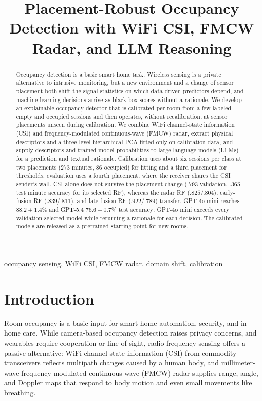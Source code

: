 \documentclass[conference,10pt,letterpaper]{IEEEtran}
\title{Placement-Robust Occupancy Detection with WiFi CSI, FMCW Radar, and LLM Reasoning}
\author{\IEEEauthorblockN{Gad Gad\IEEEauthorrefmark{1}, Mostafa Fouda\IEEEauthorrefmark{2}, Zubair Md Fadlullah\IEEEauthorrefmark{1}}
\IEEEauthorblockA{\IEEEauthorrefmark{1}Department of Computer Science, Western University, London, ON, Canada\\
\IEEEauthorrefmark{2}Department of Electrical and Computer Engineering, Idaho State University, Pocatello, ID, USA}}
\begin{document}
\maketitle
\begin{abstract}

Occupancy detection is a basic smart home task. Wireless sensing is a private alternative to intrusive monitoring, but a new environment and a change of sensor placement both shift the signal statistics on which data-driven predictors depend, and machine-learning decisions arrive as black-box scores without a rationale. We develop an explainable occupancy detector that is calibrated per room from a few labeled empty and occupied sessions and then operates, without recalibration, at sensor placements unseen during calibration.
We combine WiFi channel-state information (CSI) and frequency-modulated continuous-wave (FMCW) radar, extract physical descriptors and a three-level hierarchical PCA fitted only on calibration data, and supply descriptors and trained-model probabilities to large language models (LLMs) for a prediction and textual rationale. Calibration uses about six sessions per class at two placements (273 minutes, 86 occupied) for fitting and a third placement for thresholds; evaluation uses a fourth placement, where the receiver shares the CSI sender's wall. CSI alone does not survive the placement change (.793 validation, .365 test minute accuracy for its selected RF), whereas the radar RF ($.825/.804$), early-fusion RF ($.839/.811$), and late-fusion RF ($.922/.789$) transfer. GPT-4o mini reaches $88.2\pm1.4$\% and GPT-5.4 $76.6\pm0.7$\% test accuracy; GPT-4o mini exceeds every validation-selected model while returning a rationale for each decision. The calibrated models are released as a pretrained starting point for new rooms.

\end{abstract}
\begin{IEEEkeywords}
occupancy sensing, WiFi CSI, FMCW radar, domain shift, calibration
\end{IEEEkeywords}

\section{Introduction}\label{sec:intro}
Room occupancy is a basic input for smart home automation, security, and in-home care. While camera-based occupancy detection raises privacy concerns, and wearables require cooperation or line of sight, radio frequency sensing offers a passive alternative: WiFi channel-state information (CSI) from commodity transceivers reflects multipath changes caused by a human body, and millimeter-wave frequency-modulated continuous-wave (FMCW) radar supplies range, angle, and Doppler maps that respond to body motion and even small movements like breathing. 
\end{document}

